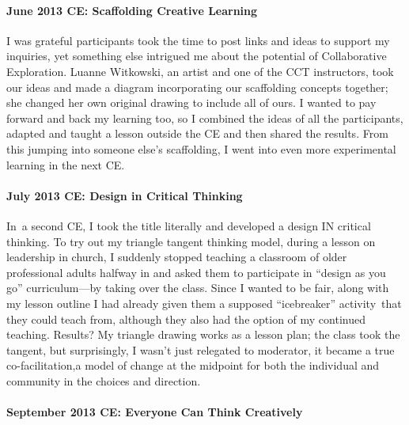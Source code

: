 \paragraph{June 2013 CE: Scaffolding Creative
Learning}\label{june-2013-ce-scaffolding-creative-learning}

I was grateful participants took the time to post links and ideas to
support my inquiries, yet something else intrigued me about the
potential of Collaborative Exploration. Luanne Witkowski, an artist and
one of the CCT instructors, took our ideas and made a diagram
incorporating our scaffolding concepts together; she changed her own
original drawing to include all of ours. I wanted to pay forward and
back my learning too, so I combined the ideas of all the participants,
adapted and taught a lesson outside the CE and then shared the results.
From this jumping into someone else's scaffolding, I went into even more
experimental learning in the next CE.

\paragraph{July 2013 CE: Design in Critical
Thinking}\label{july-2013-ce-design-in-critical-thinking}

In~a second CE, I took the title literally and developed a design IN
critical thinking. To try out my triangle tangent thinking model, during
a lesson on leadership in church, I suddenly stopped teaching a
classroom of older professional adults halfway in and asked them to
participate in ``design as you go'' curriculum---by taking over the
class. Since I wanted to be fair, along with my lesson outline I had
already given them a supposed ``icebreaker'' activity~that they could
teach from, although they also had the option of my continued teaching.
Results? My triangle drawing works as a lesson plan; the class took the
tangent, but surprisingly, I wasn't just relegated to moderator, it
became a true co-facilitation,a model of change at the midpoint for both
the individual and community in the choices and direction.

\paragraph{September 2013 CE: Everyone Can Think
Creatively}\label{september-2013-ce-everyone-can-think-creatively}

